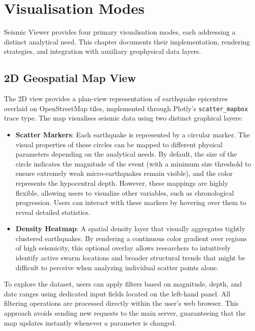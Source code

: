 
\chapter{Visualisation Modes}
\label{ch:visualisation}

Seismic Viewer provides four primary visualisation modes, each addressing a distinct analytical need. This chapter documents their implementation, rendering strategies, and integration with auxiliary geophysical data layers.

\section{2D Geospatial Map View}
\label{sec:view-2d}

The 2D view provides a plan-view representation of earthquake epicentres overlaid on OpenStreetMap \cite{openstreetmap} tiles, implemented through Plotly's \texttt{scatter\_mapbox} trace type. The map visualises seismic data using two distinct graphical layers:
\begin{itemize}
    \item \textbf{Scatter Markers}: Each earthquake is represented by a circular marker. The visual properties of these circles can be mapped to different physical parameters depending on the analytical needs. By default, the size of the circle indicates the magnitude of the event (with a minimum size threshold to ensure extremely weak micro-earthquakes remain visible), and the color represents the hypocentral depth. However, these mappings are highly flexible, allowing users to visualize other variables, such as chronological progression. Users can interact with these markers by hovering over them to reveal detailed statistics.
    \item \textbf{Density Heatmap}: A spatial density layer that visually aggregates tightly clustered earthquakes. By rendering a continuous color gradient over regions of high seismicity, this optional overlay allows researchers to intuitively identify active swarm locations and broader structural trends that might be difficult to perceive when analyzing individual scatter points alone.
\end{itemize}

To explore the dataset, users can apply filters based on magnitude, depth, and date ranges using dedicated input fields located on the left-hand panel. All filtering operations are processed directly within the user's web browser. This approach avoids sending new requests to the main server, guaranteeing that the map updates instantly whenever a parameter is changed.

